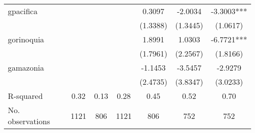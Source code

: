 \begin{table}
\begin{center}
\begin{tabular}{lcccccc}
gpacifica             &            &           &           & 0.3097     & -2.0034     & -3.3003***  \\
                      &            &           &           & (1.3388)   & (1.3445)    & (1.0617)    \\
gorinoquia            &            &           &           & 1.8991     & 1.0303      & -6.7721***  \\
                      &            &           &           & (1.7961)   & (2.2567)    & (1.8166)    \\
gamazonia             &            &           &           & -1.1453    & -3.5457     & -2.9279     \\
                      &            &           &           & (2.4735)   & (3.8347)    & (3.0233)    \\
R-squared             & 0.32       & 0.13      & 0.28      & 0.45       & 0.52        & 0.70        \\
No. observations      & 1121       & 806       & 1121      & 806        & 752         & 752         \\
\hline
\end{tabular}
\end{center}
\end{table}